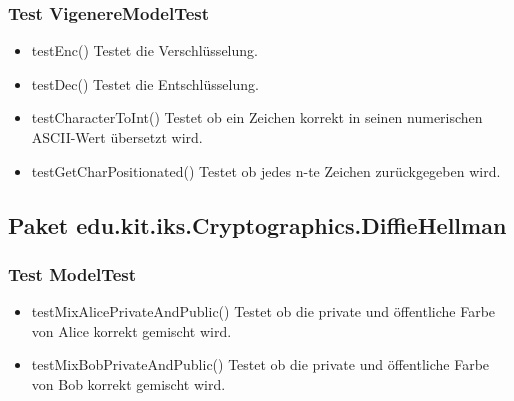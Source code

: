 \documentclass{article}
\begin{document}
  \subsubsection{Test VigenereModelTest}
   \begin{itemize}
    \item testEnc()\newline
          Testet die Verschlüsselung.
    \item testDec()\newline
          Testet die Entschlüsselung.
    \item testCharacterToInt()\newline
          Testet ob ein Zeichen korrekt in seinen numerischen ASCII-Wert übersetzt wird.
    \item testGetCharPositionated()\newline
          Testet ob jedes n-te Zeichen zurückgegeben wird.
  \end{itemize}

  \subsection{Paket edu.kit.iks.Cryptographics.DiffieHellman}
  \subsubsection{Test ModelTest}
   \begin{itemize}
    \item testMixAlicePrivateAndPublic()\newline
          Testet ob die private und öffentliche Farbe von Alice korrekt gemischt wird.
    \item testMixBobPrivateAndPublic()\newline
          Testet ob die private und öffentliche Farbe von Bob korrekt gemischt wird.
  \end{itemize}

 \restoregeometry

\glsaddall
\printglossary[numberedsection, style=altlist]
\end{document}
